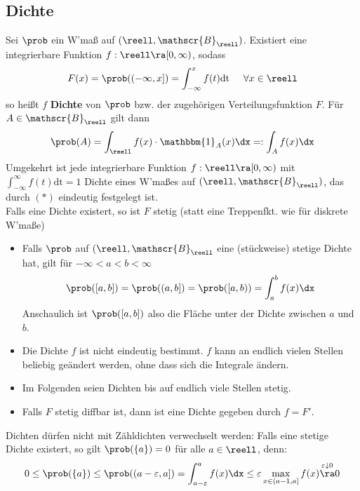 \documentclass{kit}
\begin{document}
  \subsection{Dichte}
    Sei $\prob$ ein W'maß auf $(\reell,\mathscr{B}_\reell)$. Existiert eine integrierbare Funktion $f:\reell\ra[0,\infty)$,
    sodass
    $$F(x)=\prob((-\infty,x])=\int^x_{-\infty}f(t)\text{dt}\hspace{0.5cm}\forall x\in\reell$$
    so heißt $f$ \textbf{Dichte} von $\prob$ bzw. der zugehörigen Verteilungsfunktion $F$. Für $A\in\mathscr{B}_\reell$ 
    gilt dann
    $$\prob(A)=\int_\reell f(x)\cdot\mathbbm{1}_A(x)\dx=:\int_Af(x)\dx$$
    Umgekehrt ist jede integrierbare Funktion $f:\reell\ra[0,\infty)$ mit $\int^\infty_{-\infty}f(t)\text{dt}=1$ Dichte
    eines W'maßes auf $(\reell,\mathscr{B}_\reell)$, das durch $(*)$ eindeutig festgelegt ist.\\
    Falls eine Dichte existert, so ist $F$ stetig (statt eine Treppenfkt. wie für diskrete W'maße)
    \begin{itemize}
      \item Falls $\prob$ auf $(\reell,\mathscr{B}_\reell$ eine (stückweise) stetige Dichte hat, gilt für 
        $-\infty<a<b<\infty$
        $$\prob([a,b])=\prob((a,b])=\prob([a,b))=\int^b_af(x)\dx$$
        Anschaulich ist $\prob([a,b])$ also die Fläche unter der Dichte zwischen $a$ und $b$.
      \item Die Dichte $f$ ist nicht eindeutig bestimmt. $f$ kann an endlich vielen Stellen beliebig geändert werden, ohne
        dass sich die Integrale ändern.
      \item Im Folgenden seien Dichten bis auf endlich viele Stellen stetig.
      \item Falls $F$ stetig diffbar ist, dann ist eine Dichte gegeben durch $f=F'$.
    \end{itemize}
    Dichten dürfen nicht mit Zähldichten verwechselt werden: Falls eine stetige Dichte existert, so gilt $\prob(\{a\})=0$
    für alle $a\in\reell$, denn:
    $$0\le\prob(\{a\})\le\prob((a-\varepsilon,a])=\int^a_{a-\varepsilon}f(x)\dx\le\varepsilon\max_{x\in(a-1,a]}f(x)
    \overset{\varepsilon\downarrow0}{\ra}0$$
\end{document}
